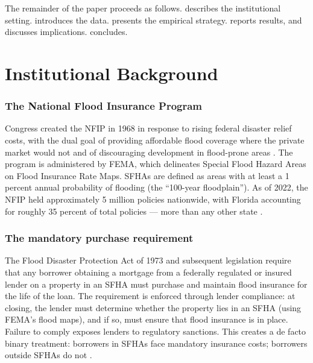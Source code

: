 \documentclass[12pt]{article}
\begin{document}
The remainder of the paper proceeds as follows.  describes the institutional setting.  introduces the data.  presents the empirical strategy.  reports results, and  discusses implications.  concludes.


\section{Institutional Background}
\label{sec:background}

\subsubsection*{The National Flood Insurance Program} Congress created the NFIP in 1968 in response to rising federal disaster relief costs, with the dual goal of providing affordable flood coverage where the private market would not and of discouraging development in flood-prone areas \citep{kousky2018financing}. The program is administered by FEMA, which delineates Special Flood Hazard Areas on Flood Insurance Rate Maps. SFHAs are defined as areas with at least a 1 percent annual probability of flooding (the ``100-year floodplain''). As of 2022, the NFIP held approximately 5 million policies nationwide, with Florida accounting for roughly 35 percent of total policies --- more than any other state \citep{naic2022flood, fema2021risk}.

\subsubsection*{The mandatory purchase requirement} The Flood Disaster Protection Act of 1973 and subsequent legislation require that any borrower obtaining a mortgage from a federally regulated or insured lender on a property in an SFHA must purchase and maintain flood insurance for the life of the loan. The requirement is enforced through lender compliance: at closing, the lender must determine whether the property lies in an SFHA (using FEMA's flood maps), and if so, must ensure that flood insurance is in place. Failure to comply exposes lenders to regulatory sanctions. This creates a de facto binary treatment: borrowers in SFHAs face mandatory insurance costs; borrowers outside SFHAs do not \citep{browne2000economic}.
\end{document}
